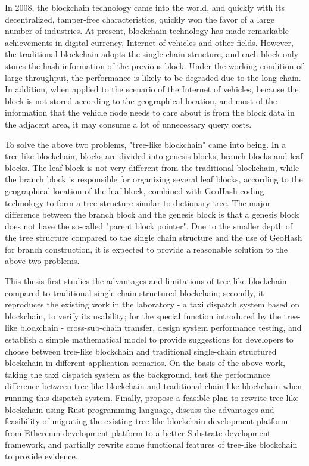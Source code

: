 \begin{abstractEn}
In 2008, the blockchain technology came into the world, and quickly with its decentralized, tamper-free characteristics, quickly won the favor of a large number of industries. At present, blockchain technology has made remarkable achievements in digital currency, Internet of vehicles and other fields. However, the traditional blockchain adopts the single-chain structure, and each block only stores the hash information of the previous block. Under the working condition of large throughput, the performance is likely to be degraded due to the long chain. In addition, when applied to the scenario of the Internet of vehicles, because the block is not stored according to the geographical location, and most of the information that the vehicle node needs to care about is from the block data in the adjacent area, it may consume a lot of unnecessary query costs.

To solve the above two problems, "tree-like blockchain" came into being. In a tree-like blockchain, blocks are divided into genesis blocks, branch blocks and leaf blocks. The leaf block is not very different from the traditional blockchain, while the branch block is responsible for organizing several leaf blocks, according to the geographical location of the leaf block, combined with GeoHash coding technology to form a tree structure similar to dictionary tree. The major difference between the branch block and the genesis block is that a genesis block does not have the so-called "parent block pointer". Due to the smaller depth of the tree structure compared to the single chain structure and the use of GeoHash for branch construction, it is expected to provide a reasonable solution to the above two problems.

This thesis first studies the advantages and limitations of tree-like blockchain compared to traditional single-chain structured blockchain; secondly, it reproduces the existing work in the laboratory - a taxi dispatch system based on blockchain, to verify its usability; for the special function introduced by the tree-like blockchain - cross-sub-chain transfer, design system performance testing, and establish a simple mathematical model to provide suggestions for developers to choose between tree-like blockchain and traditional single-chain structured blockchain in different application scenarios. On the basis of the above work, taking the taxi dispatch system as the background, test the performance difference between tree-like blockchain and traditional chain-like blockchain when running this dispatch system. Finally, propose a feasible plan to rewrite tree-like blockchain using Rust programming language, discuss the advantages and feasibility of migrating the existing tree-like blockchain development platform from Ethereum development platform to a better Substrate development framework, and partially rewrite some functional features of tree-like blockchain to provide evidence.

\end{abstractEn}
